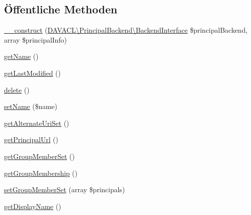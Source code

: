 \subsection*{Öffentliche Methoden}
\begin{DoxyCompactItemize}
\item 
\mbox{\hyperlink{class_sabre_1_1_cal_d_a_v_1_1_principal_1_1_proxy_read_adb01be675e14eb27e0b57a1270d22268}{\+\_\+\+\_\+construct}} (\mbox{\hyperlink{interface_sabre_1_1_d_a_v_a_c_l_1_1_principal_backend_1_1_backend_interface}{D\+A\+V\+A\+C\+L\textbackslash{}\+Principal\+Backend\textbackslash{}\+Backend\+Interface}} \$principal\+Backend, array \$principal\+Info)
\item 
\mbox{\hyperlink{class_sabre_1_1_cal_d_a_v_1_1_principal_1_1_proxy_read_a872398a5681d2f434498c8e632fee88e}{get\+Name}} ()
\item 
\mbox{\hyperlink{class_sabre_1_1_cal_d_a_v_1_1_principal_1_1_proxy_read_a62ef8f211758d660cf090b6e8f4d88f5}{get\+Last\+Modified}} ()
\item 
\mbox{\hyperlink{class_sabre_1_1_cal_d_a_v_1_1_principal_1_1_proxy_read_ace500b12e505b0ec74e831401a0e9550}{delete}} ()
\item 
\mbox{\hyperlink{class_sabre_1_1_cal_d_a_v_1_1_principal_1_1_proxy_read_a1735391e37c5fa938d06a18faee5cadb}{set\+Name}} (\$name)
\item 
\mbox{\hyperlink{class_sabre_1_1_cal_d_a_v_1_1_principal_1_1_proxy_read_a110ccaf5f2e2a9c366280f9d7627ff7f}{get\+Alternate\+Uri\+Set}} ()
\item 
\mbox{\hyperlink{class_sabre_1_1_cal_d_a_v_1_1_principal_1_1_proxy_read_af1080cef7fe7a5769be9cc82ff959a44}{get\+Principal\+Url}} ()
\item 
\mbox{\hyperlink{class_sabre_1_1_cal_d_a_v_1_1_principal_1_1_proxy_read_a397ef7443da29e867f986b0fd1c498d6}{get\+Group\+Member\+Set}} ()
\item 
\mbox{\hyperlink{class_sabre_1_1_cal_d_a_v_1_1_principal_1_1_proxy_read_a90cc837d2d8cdf82b369f25dc22e64c3}{get\+Group\+Membership}} ()
\item 
\mbox{\hyperlink{class_sabre_1_1_cal_d_a_v_1_1_principal_1_1_proxy_read_a81207ae5aa2c621720fc975895bd67fc}{set\+Group\+Member\+Set}} (array \$principals)
\item 
\mbox{\hyperlink{class_sabre_1_1_cal_d_a_v_1_1_principal_1_1_proxy_read_a1ffd1507b94784b82a2289a677d40eb0}{get\+Display\+Name}} ()
\end{DoxyCompactItemize}
